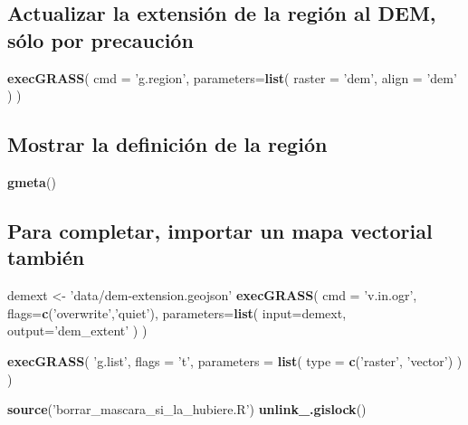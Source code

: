 \documentclass[11pt,]{article}
\newenvironment{Shaded}{\begin{snugshade}}{\end{snugshade}}
\newcommand{\KeywordTok}[1]{\textcolor[rgb]{0.13,0.29,0.53}{\textbf{#1}}}
\newcommand{\DataTypeTok}[1]{\textcolor[rgb]{0.13,0.29,0.53}{#1}}
\newcommand{\StringTok}[1]{\textcolor[rgb]{0.31,0.60,0.02}{#1}}
\newcommand{\NormalTok}[1]{#1}
\begin{document}
\subsection{Actualizar la extensión de la región al DEM, sólo por
precaución}\label{actualizar-la-extensiuxf3n-de-la-regiuxf3n-al-dem-suxf3lo-por-precauciuxf3n}

\begin{Shaded}
\begin{Highlighting}[]
\KeywordTok{execGRASS}\NormalTok{(}
  \DataTypeTok{cmd =} \StringTok{'g.region'}\NormalTok{,}
  \DataTypeTok{parameters=}\KeywordTok{list}\NormalTok{(}
    \DataTypeTok{raster =} \StringTok{'dem'}\NormalTok{,}
    \DataTypeTok{align =} \StringTok{'dem'}
\NormalTok{  )}
\NormalTok{)}
\end{Highlighting}
\end{Shaded}

\subsection{Mostrar la definición de la
región}\label{mostrar-la-definiciuxf3n-de-la-regiuxf3n}

\begin{Shaded}
\begin{Highlighting}[]
\KeywordTok{gmeta}\NormalTok{()}
\end{Highlighting}
\end{Shaded}

\subsection{Para completar, importar un mapa vectorial
también}\label{para-completar-importar-un-mapa-vectorial-tambiuxe9n}

\begin{Shaded}
\begin{Highlighting}[]
\NormalTok{demext <-}\StringTok{ 'data/dem-extension.geojson'}
\KeywordTok{execGRASS}\NormalTok{(}
  \DataTypeTok{cmd =} \StringTok{'v.in.ogr'}\NormalTok{,}
  \DataTypeTok{flags=}\KeywordTok{c}\NormalTok{(}\StringTok{'overwrite'}\NormalTok{,}\StringTok{'quiet'}\NormalTok{),}
  \DataTypeTok{parameters=}\KeywordTok{list}\NormalTok{(}
    \DataTypeTok{input=}\NormalTok{demext,}
    \DataTypeTok{output=}\StringTok{'dem_extent'}
\NormalTok{  )}
\NormalTok{)}

\KeywordTok{execGRASS}\NormalTok{(}
  \StringTok{'g.list'}\NormalTok{,}
  \DataTypeTok{flags =} \StringTok{'t'}\NormalTok{,}
  \DataTypeTok{parameters =} \KeywordTok{list}\NormalTok{(}
    \DataTypeTok{type =} \KeywordTok{c}\NormalTok{(}\StringTok{'raster'}\NormalTok{, }\StringTok{'vector'}\NormalTok{)}
\NormalTok{  )}
\NormalTok{)}

\KeywordTok{source}\NormalTok{(}\StringTok{'borrar_mascara_si_la_hubiere.R'}\NormalTok{)}
\KeywordTok{unlink_.gislock}\NormalTok{()}
\end{Highlighting}
\end{Shaded}
\end{document}
